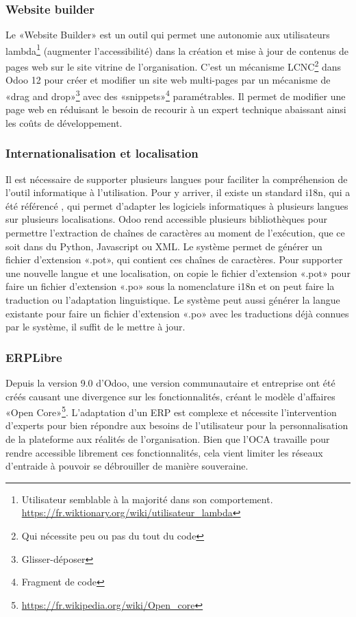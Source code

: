\subsubsection{Website builder}

Le «Website Builder» est un outil qui permet une autonomie aux utilisateurs lambda\footnote{Utilisateur semblable à la majorité dans son comportement. \url{https://fr.wiktionary.org/wiki/utilisateur_lambda}} (augmenter l'accessibilité) dans la création et mise à jour de contenus de pages web sur le site vitrine de l'organisation. C’est un mécanisme LCNC\footnote{Qui nécessite peu ou pas du tout du code} dans Odoo 12 pour créer et modifier un site web multi-pages par un mécanisme de «drag and drop»\footnote{Glisser-déposer} avec des «snippets»\footnote{Fragment de code} paramétrables. Il permet de modifier une page web en réduisant le besoin de recourir à un expert technique abaissant ainsi les coûts de développement.

\subsubsection{Internationalisation et localisation}

Il est nécessaire de supporter plusieurs langues pour faciliter la compréhension de l'outil informatique à l'utilisation. Pour y arriver, il existe un standard i18n, qui a été référencé \cite{i18n_wiley}, qui permet d'adapter les logiciels informatiques à plusieurs langues sur plusieurs localisations\cite{wikipedia_i18n}. Odoo rend accessible plusieurs bibliothèques pour permettre l’extraction de chaînes de caractères au moment de l’exécution, que ce soit dans du Python, Javascript ou XML. Le système permet de générer un fichier d'extension «.pot», qui contient ces chaînes de caractères. Pour supporter une nouvelle langue et une localisation, on copie le fichier d'extension «.pot» pour faire un fichier d'extension «.po» sous la nomenclature i18n et on peut faire la traduction ou l’adaptation linguistique. Le système peut aussi générer la langue existante pour faire un fichier d'extension «.po» avec les traductions déjà connues par le système, il suffit de le mettre à jour.

\subsubsection{ERPLibre}

Depuis la version 9.0 d'Odoo, une version communautaire et entreprise ont été créés causant une divergence sur les fonctionnalités, créant le modèle d'affaires «Open Core»\footnote{\url{https://fr.wikipedia.org/wiki/Open_core}}. L'adaptation d'un ERP est complexe et nécessite l'intervention d'experts pour bien répondre aux besoins de l'utilisateur pour la personnalisation de la plateforme aux réalités de l'organisation. Bien que l'OCA travaille pour rendre accessible librement ces fonctionnalités, cela vient limiter les réseaux d'entraide à pouvoir se débrouiller de manière souveraine.

